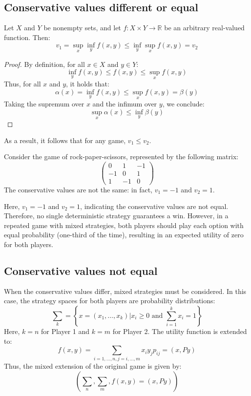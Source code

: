 \subsection{Conservative values different or equal}
\begin{proposition}
    Let $X$ and $Y$ be nonempty sets, and let $f : X \times Y \rightarrow \mathbb{R}$ be an arbitrary real-valued function.
    Then: 
    \[v_1 = \sup_x\inf_yf (x, y) \leq \inf_y\sup_xf (x, y) = v_2\]
\end{proposition}
\begin{proof}
    By definition, for all $x \in X$ and $y \in Y$:
    \[\inf_yf(x, y) \leq f (x, y) \leq \sup_xf (x, y)\]
    Thus, for all $x$ and $y$, it holds that:
    \[\alpha(x) = \inf_yf (x, y) \leq \sup_xf (x, y) = \beta(y)\]
    Taking the supremum over $x$ and the infimum over $y$, we conclude:
    \[\sup_x\alpha(x) \leq \inf_y\beta(y)\]
\end{proof}
As a result, it follows that for any game, $v_1 \leq v_2$.
\begin{example}
    Consider the game of rock-paper-scissors, represented by the following matrix:
    \[\begin{pmatrix} 0 & 1 & -1 \\ -1 & 0 & 1 \\ 1 & -1 & 0 \end{pmatrix}\]
    The conservative values are not the same: in fact, $v_1 = -1$ and $v_2 = 1$. 

    Here, $v_1 = -1$ and $v_2 = 1$, indicating the conservative values are not equal. 
    Therefore, no single deterministic strategy guarantees a win. 
    However, in a repeated game with mixed strategies, both players should play each option with equal probability (one-third of the time), resulting in an expected utility of zero for both players.
\end{example}

\subsection{Conservative values not equal}
When the conservative values differ, mixed strategies must be considered. 
In this case, the strategy spaces for both players are probability distributions:
\[\sum_k=\left\{x=(x_1,\dots,x_k)|x_i\geq 0 \text{ and }\sum_{i=1}^{k}x_i=1\right\}\]
Here, $k = n$ for Player 1 and $k = m$ for Player 2. 
The utility function is extended to:
\[f(x,y)=\sum_{i=1,\dots,n,j=i,\dots,m}x_iy_jp_{ij}=(x,Py)\]
Thus, the mixed extension of the original game is given by:
\[\left(\sum_n, \sum_m, f (x, y) = (x, Py)\right)\]

